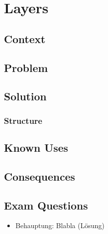 \chapter{Layers}

\section{Context}


\section{Problem}


\section{Solution}


\subsection{Structure}

%  

\section{Known Uses}


\section{Consequences}
\begin{itemize}

\end{itemize}

\section{Exam Questions}
\begin{itemize}
  \item Behauptung: Blabla (Lösung)
\end{itemize}
